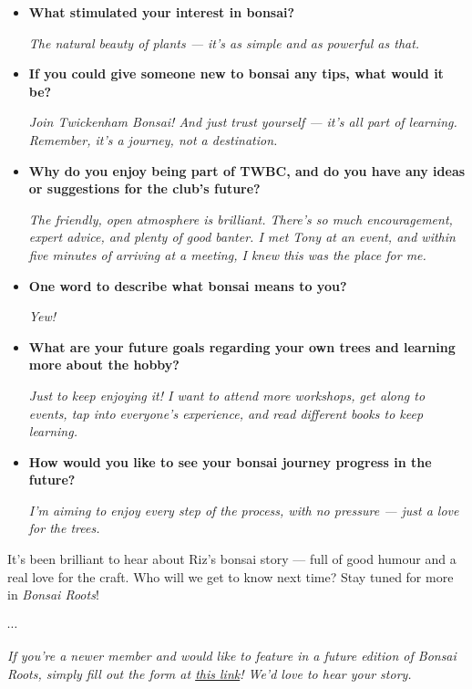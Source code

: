 \begin{itemize}
    \emph{Ooh, for quite some time now. I've always enjoyed the challenge of growing exotic plants like bananas, palms, and cannas --- and from there, bonsai naturally caught my interest. I joined another club before but found it a bit too restrictive.}

    \item \textbf{What stimulated your interest in bonsai?}

    \emph{The natural beauty of plants --- it's as simple and as powerful as that.}

    \item \textbf{If you could give someone new to bonsai any tips, what would it be?}

    \emph{Join Twickenham Bonsai! And just trust yourself --- it's all part of learning. Remember, it's a journey, not a destination.}

    \item \textbf{Why do you enjoy being part of TWBC, and do you have any ideas or suggestions for the club's future?}

    \emph{The friendly, open atmosphere is brilliant. There's so much encouragement, expert advice, and plenty of good banter. I met Tony at an event, and within five minutes of arriving at a meeting, I knew this was the place for me.}

    \item \textbf{One word to describe what bonsai means to you?}

    \emph{Yew!}

    \item \textbf{What are your future goals regarding your own trees and learning more about the hobby?}

    \emph{Just to keep enjoying it! I want to attend more workshops, get along to events, tap into everyone's experience, and read different books to keep learning.}

    \item \textbf{How would you like to see your bonsai journey progress in the future?}

    \emph{I'm aiming to enjoy every step of the process, with no pressure --- just a love for the trees.}
\end{itemize}

It's been brilliant to hear about Riz's bonsai story --- full of good humour and a real love for the craft.
Who will we get to know next time? Stay tuned for more in \emph{Bonsai Roots}!

\begin{center}
    $\cdots$
\end{center}

\noindent
\emph{If you're a newer member and would like to feature in a future edition of Bonsai Roots, simply fill out the form at \href{https://forms.gle/quVXa4L8rhpnT5kr6}{this link}! We'd love to hear your story.}
\closearticle 
\pagebreak

